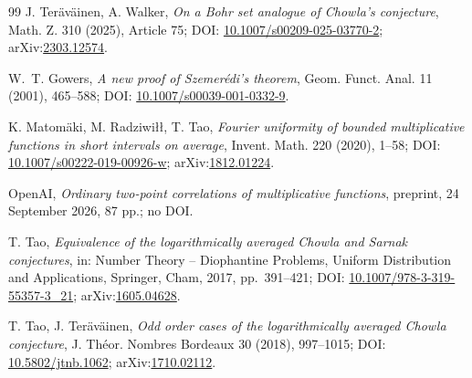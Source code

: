 \documentclass[preprint,12pt]{elsarticle}
\numberwithin{equation}{section}
\theoremstyle{plain}
\theoremstyle{definition}
\theoremstyle{definition}
\theoremstyle{remark}
\begin{document}
\begin{thebibliography}{99}
J. Ter\"av\"ainen, A. Walker,
\textit{On a Bohr set analogue of Chowla's conjecture},
Math. Z. 310 (2025), Article 75; DOI: \href{https://doi.org/10.1007/s00209-025-03770-2}{10.1007/s00209-025-03770-2};
arXiv:\href{https://arxiv.org/abs/2303.12574}{2303.12574}.

W.~T. Gowers,
\textit{A new proof of Szemer\'edi's theorem},
Geom. Funct. Anal. 11 (2001), 465--588;
DOI: \href{https://doi.org/10.1007/s00039-001-0332-9}{10.1007/s00039-001-0332-9}.

K. Matom\"aki, M. Radziwi{\l}{\l}, T. Tao,
\textit{Fourier uniformity of bounded multiplicative functions in short intervals on average},
Invent. Math. 220 (2020), 1--58;
DOI: \href{https://doi.org/10.1007/s00222-019-00926-w}{10.1007/s00222-019-00926-w};
arXiv:\href{https://arxiv.org/abs/1812.01224}{1812.01224}.

OpenAI,
\textit{Ordinary two-point correlations of multiplicative functions},
preprint, 24 September 2026, 87 pp.; no DOI.

T. Tao,
\textit{Equivalence of the logarithmically averaged Chowla and Sarnak conjectures},
in: Number Theory -- Diophantine Problems, Uniform Distribution and Applications,
Springer, Cham, 2017, pp.~391--421;
DOI: \href{https://doi.org/10.1007/978-3-319-55357-3_21}{10.1007/978-3-319-55357-3\_21};
arXiv:\href{https://arxiv.org/abs/1605.04628}{1605.04628}.

T. Tao, J. Ter\"av\"ainen,
\textit{Odd order cases of the logarithmically averaged Chowla conjecture},
J. Th\'eor. Nombres Bordeaux 30 (2018), 997--1015;
DOI: \href{https://doi.org/10.5802/jtnb.1062}{10.5802/jtnb.1062};
arXiv:\href{https://arxiv.org/abs/1710.02112}{1710.02112}.

\end{thebibliography}
\end{document}
